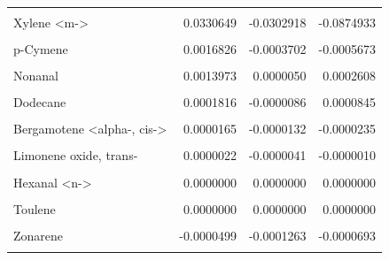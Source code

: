 \documentclass[12pt,final,CPage]{ufthesis}
\begin{document}
{\begin{longtable}[t]{lrrr}
  \endfoot
  \bottomrule
  \endlastfoot
  \cellcolor{gray!6}{Benzaldehyde} & \cellcolor{gray!6}{0.0569214} & \cellcolor{gray!6}{-0.0777897} & \cellcolor{gray!6}{-0.1680448}\\
  Xylene <m-> & 0.0330649 & -0.0302918 & -0.0874933\\
  \cellcolor{gray!6}{Sulindac sulfide} & \cellcolor{gray!6}{0.0021211} & \cellcolor{gray!6}{-0.0005466} & \cellcolor{gray!6}{-0.0007970}\\
  p-Cymene & 0.0016826 & -0.0003702 & -0.0005673\\
  \cellcolor{gray!6}{Squalene} & \cellcolor{gray!6}{0.0016661} & \cellcolor{gray!6}{-0.0003497} & \cellcolor{gray!6}{0.0000317}\\
  \addlinespace
  Nonanal & 0.0013973 & 0.0000050 & 0.0002608\\
  \cellcolor{gray!6}{Pentadecane} & \cellcolor{gray!6}{0.0003956} & \cellcolor{gray!6}{-0.0001613} & \cellcolor{gray!6}{-0.0002113}\\
  Dodecane & 0.0001816 & -0.0000086 & 0.0000845\\
  \cellcolor{gray!6}{Hexadecane, 1-bromo-} & \cellcolor{gray!6}{0.0000403} & \cellcolor{gray!6}{0.0000000} & \cellcolor{gray!6}{0.0000200}\\
  Bergamotene <alpha-, cis-> & 0.0000165 & -0.0000132 & -0.0000235\\
  \addlinespace
  \cellcolor{gray!6}{Terpineol <alpha->} & \cellcolor{gray!6}{0.0000036} & \cellcolor{gray!6}{0.0000000} & \cellcolor{gray!6}{0.0000002}\\
  Limonene oxide, trans- & 0.0000022 & -0.0000041 & -0.0000010\\
  \cellcolor{gray!6}{Undecane} & \cellcolor{gray!6}{0.0000016} & \cellcolor{gray!6}{-0.0000065} & \cellcolor{gray!6}{-0.0000002}\\
  Hexanal <n-> & 0.0000000 & 0.0000000 & 0.0000000\\
  \cellcolor{gray!6}{Napthlene, 1,6-dimethyl-4-1-methylethyl)-)} & \cellcolor{gray!6}{0.0000000} & \cellcolor{gray!6}{0.0000000} & \cellcolor{gray!6}{0.0000000}\\
  \addlinespace
  Toulene & 0.0000000 & 0.0000000 & 0.0000000\\
  \cellcolor{gray!6}{Phellandrene <beta->} & \cellcolor{gray!6}{-0.0000091} & \cellcolor{gray!6}{-0.0001475} & \cellcolor{gray!6}{-0.0001614}\\
  Zonarene & -0.0000499 & -0.0001263 & -0.0000693\\
  \cellcolor{gray!6}{Caryophyllene oxide} & \cellcolor{gray!6}{-0.0000610} & \cellcolor{gray!6}{-0.0002356} & \cellcolor{gray!6}{-0.0000683}\\

\end{longtable}}
\end{document}
